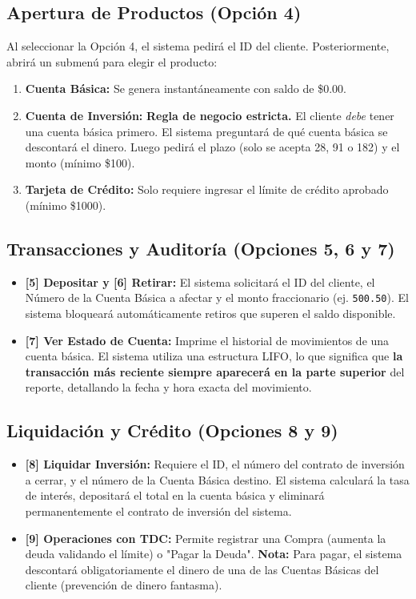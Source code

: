 \documentclass[12pt, letterpaper]{article}
\begin{document}
	\subsection{Apertura de Productos (Opción 4)}
	Al seleccionar la Opción 4, el sistema pedirá el ID del cliente. Posteriormente, abrirá un submenú para elegir el producto:
	\begin{enumerate}
		\item \textbf{Cuenta Básica:} Se genera instantáneamente con saldo de \$0.00.
		\item \textbf{Cuenta de Inversión:} \textbf{Regla de negocio estricta.} El cliente \textit{debe} tener una cuenta básica primero. El sistema preguntará de qué cuenta básica se descontará el dinero. Luego pedirá el plazo (solo se acepta 28, 91 o 182) y el monto (mínimo \$100).
		\item \textbf{Tarjeta de Crédito:} Solo requiere ingresar el límite de crédito aprobado (mínimo \$1000).
	\end{enumerate}
	
	\subsection{Transacciones y Auditoría (Opciones 5, 6 y 7)}
	\begin{itemize}
		\item \textbf{[5] Depositar y [6] Retirar:} El sistema solicitará el ID del cliente, el Número de la Cuenta Básica a afectar y el monto fraccionario (ej. \texttt{500.50}). El sistema bloqueará automáticamente retiros que superen el saldo disponible.
		\item \textbf{[7] Ver Estado de Cuenta:} Imprime el historial de movimientos de una cuenta básica. El sistema utiliza una estructura LIFO, lo que significa que \textbf{la transacción más reciente siempre aparecerá en la parte superior} del reporte, detallando la fecha y hora exacta del movimiento.
	\end{itemize}
	
	\subsection{Liquidación y Crédito (Opciones 8 y 9)}
	\begin{itemize}
		\item \textbf{[8] Liquidar Inversión:} Requiere el ID, el número del contrato de inversión a cerrar, y el número de la Cuenta Básica destino. El sistema calculará la tasa de interés, depositará el total en la cuenta básica y eliminará permanentemente el contrato de inversión del sistema.
		\item \textbf{[9] Operaciones con TDC:} Permite registrar una Compra (aumenta la deuda validando el límite) o "Pagar la Deuda". \textbf{Nota:} Para pagar, el sistema descontará obligatoriamente el dinero de una de las Cuentas Básicas del cliente (prevención de dinero fantasma).
	\end{itemize}
	
\end{document}
